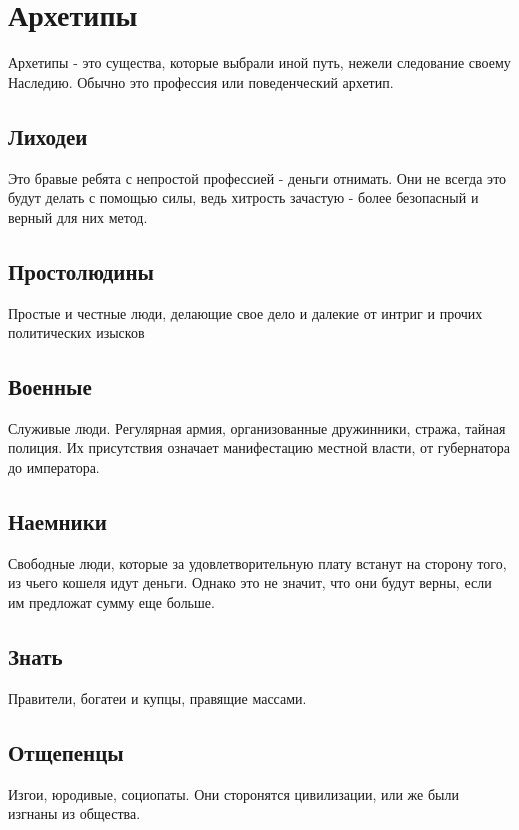 \printindex[monsters]

\newpage \section{Архетипы}
Архетипы - это существа, которые выбрали иной путь, нежели следование своему Наследию. Обычно это профессия или поведенческий архетип.

\subsection{Лиходеи}
Это бравые ребята с непростой профессией - деньги отнимать. Они не всегда это будут делать с помощью силы, ведь хитрость зачастую - более безопасный и верный для них метод.

\subsection{Простолюдины}
Простые и честные люди, делающие свое дело и далекие от интриг и прочих политических изысков

\subsection{Военные}
Служивые люди. Регулярная армия, организованные дружинники, стража, тайная полиция. Их присутствия означает манифестацию местной власти, от губернатора до императора.

\subsection{Наемники}
Свободные люди, которые за удовлетворительную плату встанут на сторону того, из чьего кошеля идут деньги. Однако это не значит, что они будут верны, если им предложат сумму еще больше.

\subsection{Знать}
Правители, богатеи и купцы, правящие массами.

\subsection{Отщепенцы}
Изгои, юродивые, социопаты. Они сторонятся цивилизации, или же были изгнаны из общества.

